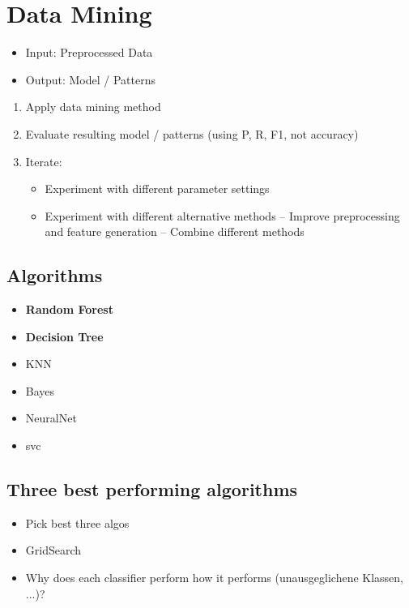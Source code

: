 \chapter{Data Mining}
\label{cha:data_mining}
\begin{itemize}
	\item Input: Preprocessed Data
	\item Output: Model / Patterns
\end{itemize}

\begin{enumerate}
	\item Apply data mining method
	\item Evaluate resulting model / patterns (using P, R, F1, not accuracy)
	\item Iterate:
	\begin{itemize}
		\item Experiment with different parameter settings
		\item Experiment with different alternative methods – Improve preprocessing and feature generation – Combine different methods
	\end{itemize}
\end{enumerate}

\section{Algorithms}
\begin{itemize}
	\item \textbf{Random Forest}
	\item \textbf{Decision Tree}
	\item KNN
	\item Bayes
	\item NeuralNet
	\item svc
\end{itemize}

\section{Three best performing algorithms}
\begin{itemize}
	\item Pick best three algos
	\item GridSearch
	\item Why does each classifier perform how it performs (unausgeglichene Klassen, ...)?
\end{itemize}
